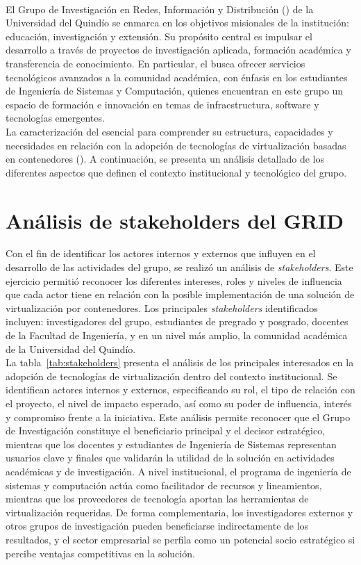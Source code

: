 \label{cap:caracterizacionGRID}
\mbox{}\\
El Grupo de Investigación en Redes, Información y Distribución (\GRID) de la Universidad del Quindío se enmarca en los objetivos misionales de la institución: educación, investigación y extensión. Su propósito central es impulsar el desarrollo a través de proyectos de investigación aplicada, formación académica y transferencia de conocimiento. En particular, el \GRID busca ofrecer servicios tecnológicos avanzados a la comunidad académica, con énfasis en los estudiantes de Ingeniería de Sistemas y Computación, quienes encuentran en este grupo un espacio de formación e innovación en temas de infraestructura, software y tecnologías emergentes.\\
La caracterización del \GRID\@resulta esencial para comprender su estructura, capacidades y necesidades en relación con la adopción de tecnologías de virtualización basadas en contenedores (\VBC). A continuación, se presenta un análisis detallado de los diferentes aspectos que definen el contexto institucional y tecnológico del grupo.

\section{Análisis de stakeholders del GRID}
Con el fin de identificar los actores internos y externos que influyen en el desarrollo de las actividades del grupo, se realizó un análisis de \textit{stakeholders}. Este ejercicio permitió reconocer los diferentes intereses, roles y niveles de influencia que cada actor tiene en relación con la posible implementación de una solución de virtualización por contenedores. Los principales \textit{stakeholders} identificados incluyen: investigadores del grupo, estudiantes de pregrado y posgrado, docentes de la Facultad de Ingeniería, y en un nivel más amplio, la comunidad académica de la Universidad del Quindío.\\
La tabla~\ref{tab:stakeholders} presenta el análisis de los principales interesados en la adopción de tecnologías de virtualización dentro del contexto institucional. Se identifican actores internos y externos, especificando su rol, el tipo de relación con el proyecto, el nivel de impacto esperado, así como su poder de influencia, interés y compromiso frente a la iniciativa. Este análisis permite reconocer que el Grupo de Investigación \GRID constituye el beneficiario principal y el decisor estratégico, mientras que los docentes y estudiantes de Ingeniería de Sistemas representan usuarios clave y finales que validarán la utilidad de la solución en actividades académicas y de investigación. A nivel institucional, el programa de ingeniería de sistemas y computación actúa como facilitador de recursos y lineamientos, mientras que los proveedores de tecnología aportan las herramientas de virtualización requeridas. De forma complementaria, los investigadores externos y otros grupos de investigación pueden beneficiarse indirectamente de los resultados, y el sector empresarial se perfila como un potencial socio estratégico si percibe ventajas competitivas en la solución.


